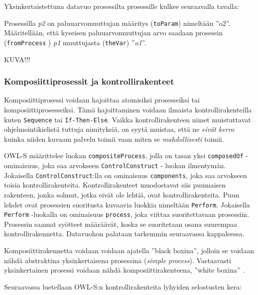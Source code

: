 \documentclass[finnish]{tktltiki2}
\theoremstyle{definition}
\theoremstyle{remark}
\begin{document}
Yksinkertaistettuna datavuo prosessilta prosessille kulkee seuraavalla tavalla: 

Prosessilla \textit{p2} on paluuarvomuuttujan määritys (\texttt{toParam}) nimeltään ''o2''. Määritellään, että kyseisen paluuarvomuuttujan arvo saadaan prosessin (\texttt{fromProcess} ) \textit{p1} muuttujasta (\texttt{theVar}) ''\textit{o1}''.  

KUVA!!!

\subsubsection{Komposiittiprosessit ja kontrollirakenteet}

Komposiittiprosessi voidaan hajoittaa atomisiksi prosesseiksi tai komposiittiprosesseiksi\cite{OWLS}. Tämä hajoittaminen voidaan ilmaista kontrollirakenteilla kuten \texttt{Sequence} tai \texttt{If-Then-Else}. Vaikka kontrollirakenteen nimet muistuttavat ohjelmointikielistä tuttuja nimityksiä, on syytä muistaa, että ne \textit{eivät kerro} kuinka niiden kuvaam palvelu toimii vaan miten se \textit{mahdollisesti} toimii\cite{OWLS}. 

OWL-S määrittelee luokan \texttt{compositeProcess}, jolla on tasan yksi \texttt{composedOf} -ominaisuus, joka saa arvokseen \texttt{ControlConstruct} - luokan ilmentymän. Jokaisella \texttt{ControlConstruct}:lla on ominaisuus \texttt{components}, joka saa arvokseen toisia kontrollirakenteita\cite{OWLS}. Kontrollirakenteet muodostavat siis puumaisen rakenteen, jonka solmut, jotka eivät ole lehtiä, ovat kontrollirakenteita. Puun lehdet ovat prosessien suoritusta kuvaavia luokkia nimeltään \texttt{Perform}. Jokaisella \texttt{Perform} -luokalla on ominaisuus \texttt{process}, joka viittaa suoritettavaan prosessiin\cite{OWLS}.  Prosessin saamat syötteet määräävät, koska se suoritetaan osana suurempaa kontrollirakennetta. Datavuohon palataan tarkemmin seuraavassa kappaleessa.

Komposiittirakennetta voidaan voidaan ajatella ''black boxina'', jolloin se voidaan nähdä abstraktina yksinkertaisena prosessina (\textit{simple process}). Vastaavasti yksinkertainen prosessi voidaan nähdä komposiittirakenteena, ''white boxina'' \cite{OWLS}. 

Seuraavassa luetellaan OWL-S:n kontrollirakenteita lyhyiden selostusten kera:      
 
\end{document}
